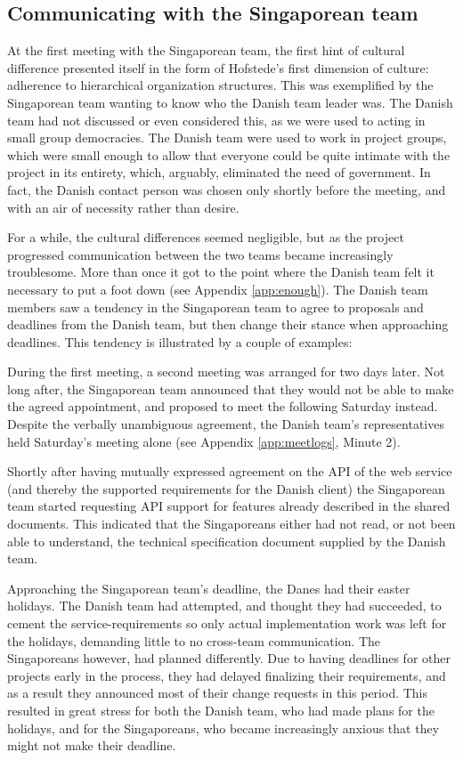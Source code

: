 \subsection{Communicating with the Singaporean team}
\label{sec:communicating}

At the first meeting with the Singaporean team, the first hint of cultural
difference presented itself in the form of Hofstede's first dimension of
culture: adherence to hierarchical organization structures\cite{surprises}.
This was exemplified by the Singaporean team wanting to know who the Danish
team leader was. The Danish team had not discussed or even considered this, as we
were used to acting in small group democracies. The Danish team were used to work in project groups, which were small enough to allow that everyone could be quite
intimate with the project in its entirety, which, arguably, eliminated the need
of government. In fact, the Danish contact person was chosen only shortly
before the meeting, and with an air of necessity rather than desire.

For a while, the cultural differences seemed negligible, but as the project
progressed communication between the two teams became increasingly troublesome.
More than once it got to the point where the Danish team felt it necessary to
put a foot down (see Appendix \ref{app:enough}). The Danish team members saw a tendency
in the Singaporean team to agree to
proposals and deadlines from the Danish team, but then change their stance when
approaching deadlines. This tendency is illustrated by a couple of examples:

During the first meeting, a second meeting was arranged for two days later. Not
long after, the Singaporean team announced that they would not be able to make
the agreed appointment, and proposed to meet the following Saturday instead.
Despite the verbally unambiguous agreement, the Danish team's
representatives held Saturday's meeting alone (see Appendix \ref{app:meetlogs},
Minute 2).

Shortly after having mutually expressed
agreement on the API of the web service (and thereby the supported requirements
for the Danish client) the Singaporean team started requesting API support for
features already described in the shared documents.
This indicated that the Singaporeans either had not read, or not been able to
understand, the technical specification document supplied by the Danish team.

Approaching the Singaporean team's deadline, the Danes had their easter
holidays. The Danish team had attempted,
and thought they had succeeded, to cement the service-requirements so only
actual implementation work was left for the holidays, demanding little to no
cross-team communication. The Singaporeans however, had planned differently.
Due to having deadlines for other projects early in the process, they had
delayed finalizing their requirements, and as a result they announced most of their change
requests in this period. This resulted in great stress for both the Danish
team, who had made plans for the holidays, and for the Singaporeans, who became
increasingly anxious that they might not make their deadline.

